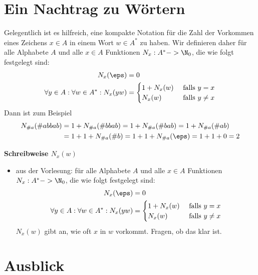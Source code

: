 \Tut\section{Ein Nachtrag zu W\"ortern}
Gelegentlich ist es hilfreich, eine kompakte Notation für die Zahl der
Vorkommen eines Zeichens $x\in A$ in einem Wort $w\in A^*$ zu
haben. Wir definieren daher für alle Alphabete $A$ und alle $x\in A$
Funktionen $N_x: A^* -> \N_0$, die wie folgt festgelegt sind:
%
\begin{align*}
  N_x(\eps) &= 0 \\
  \forall y\in A: \forall w\in A^*: N_x(yw) &=
  \begin{cases}
    1+N_x(w) & \text{ falls } y= x\\
    N_x(w) & \text{ falls } y\not= x\\
  \end{cases} \\
\end{align*}
%
Dann ist zum Beispiel
\begin{align*}
  N_{\#a}(\#{abbab}) & = 1+N_{\#a}(\#{bbab}) = 1+N_{\#a}(\#{bab}) = 1+N_{\#a}(\#{ab}) \\
  & = 1+1+N_{\#a}(\#{b}) = 1+1+N_{\#a}(\eps) = 1+1+0 = 2
\end{align*}
\begin{tutorium}
  \noindent
  \textbf{Schreibweise $N_x(w)$}
  \begin{itemize}
  \item aus der Vorlesung: für alle Alphabete $A$ und alle $x\in A$
    Funktionen $N_x: A^* -> \N_0$, die wie folgt festgelegt sind:
    \begin{align*}
      N_x(\eps) &= 0 \\
      \forall y\in A: \forall w\in A^*: N_x(yw) &=
      \begin{cases}
        1+N_x(w) & \text{ falls } y= x\\
        N_x(w) & \text{ falls } y\not= x\\
      \end{cases} \\
    \end{align*}
    $N_x(w)$ gibt an, wie oft $x$ in $w$ vorkommt. Fragen, ob das klar ist.
  \end{itemize}
\end{tutorium}

\section {Ausblick}

